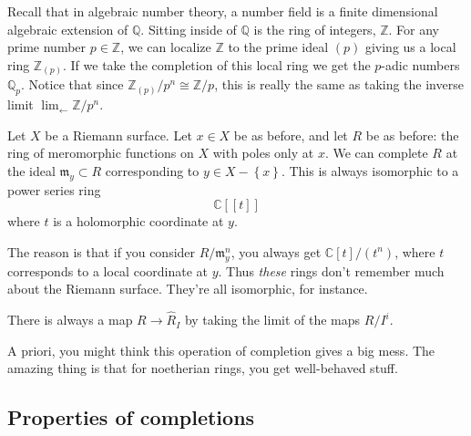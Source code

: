 \begin{example}
Recall that in algebraic number theory, a number field is a 
finite dimensional algebraic extension of $\mathbb{Q}$. 
Sitting inside of $\mathbb{Q}$ is the ring of integers, $\mathbb{Z}$. For any prime number $p\in \mathbb{Z}$, we can localize $\mathbb{Z}$ to the 
 prime ideal $(p)$ giving us a local ring $\mathbb{Z}_(p)$. 
 If we take the completion of this local ring we get the $p$-adic numbers $\mathbb{Q}_p$. Notice that since $\mathbb{Z}_(p)/p^n\cong\mathbb{Z}/p$, this is really the same as taking the inverse limit $\lim_{\leftarrow}\mathbb{Z}/p^n$.
\end{example}

\begin{example} 
Let $X$ be a Riemann surface. Let $ x \in X$ be as before, and let $R$ be as
before: the ring of meromorphic functions on $X$ with poles only at $x$. We can
complete $R$ at the ideal $\mathfrak{m}_y \subset R$ corresponding to $y \in X - \left\{x\right\}$. This
is always isomorphic to a power series ring
\[ \mathbb{C}[[t]]  \]
where $t$ is a holomorphic coordinate at $y$. 

The reason is that if you consider $R/\mathfrak{m}_y^n$, you always get
$\mathbb{C}[t]/(t^n)$, where $t$ corresponds to a local coordinate at $y$. Thus
\emph{these} rings don't remember much about the Riemann surface. They're all
isomorphic, for instance. 
\end{example} 

\begin{remark} 
There is always a map $R \to \hat{R}_I$ by taking the limit of the maps $R/I^i$.
\end{remark} 

A priori, you might think this operation of completion gives  a big mess. The amazing thing is that for
noetherian rings, you get well-behaved stuff.

\subsection{Properties of completions}


